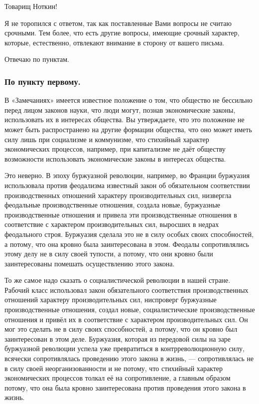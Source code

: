\documentclass[12pt, a4paper, openany]{book}
\begin{document}
Товарищ Ноткин!



Я не торопился с ответом, так как поставленные Вами вопросы не считаю срочными. Тем более, что есть другие вопросы, имеющие срочный характер, которые, естественно, отвлекают внимание в сторону от вашего письма.



Отвечаю по пунктам.



\subsubsection*{По пункту первому.}



В «Замечаниях» имеется известное положение о том, что общество не бессильно перед лицом законов науки, что люди могут, познав экономические законы, использовать их в интересах общества. Вы утверждаете, что это положение не может быть распространено на другие формации общества, что оно может иметь силу лишь при социализме и коммунизме, что стихийный характер экономических процессов, например, при капитализме не даёт обществу возможности использовать экономические законы в интересах общества.



Это неверно. В эпоху буржуазной революции, например, во Франции буржуазия использовала против феодализма известный закон об обязательном соответствии производственных отношений характеру производительных сил, низвергла феодальные производственные отношения, создала новые, буржуазные производственные отношения и привела эти производственные отношения в соответствие с характером производительных сил, выросших в недрах феодального строя. Буржуазия сделала это не в силу особых своих способностей, а потому, что она кровно была заинтересована в этом. Феодалы сопротивлялись этому делу не в силу своей тупости, а потому, что они кровно были заинтересованы помешать осуществлению этого закона.



То же самое надо сказать о социалистической революции в нашей стране. Рабочий класс использовал закон обязательного соответствия производственных отношений характеру производительных сил, ниспроверг буржуазные производственные отношения, создал новые, социалистические производственные отношения и привёл их в соответствие с характером производительных сил. Он мог это сделать не в силу своих способностей, а потому, что он кровно был заинтересован в этом деле. Буржуазия, которая из передовой силы на заре буржуазной революции успела уже превратиться в контрреволюционную силу, всячески сопротивлялась проведению этого закона в жизнь, — сопротивлялась не в силу своей неорганизованности и не потому, что стихийный характер экономических процессов толкал её на сопротивление, а главным образом потому, что она была кровно заинтересована против проведения этого закона в жизнь.
\end{document}
